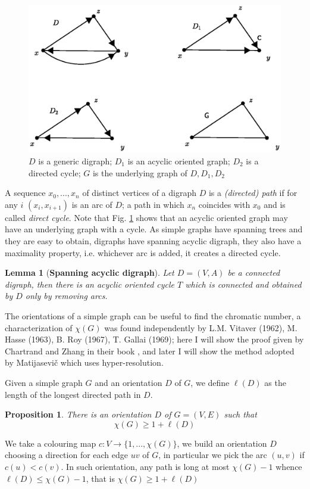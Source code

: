 \documentclass[a4paper,12pt,twoside]{book}
\newtheorem{proposition}[theorem]{Proposition}
\newtheorem{lemma}[theorem]{Lemma}
\begin{document}
\begin{figure}[h]
\centering
\includegraphics[scale=0.7]{digraphs.eps}
\caption{$D$ is a generic digraph;
		$D_1$ is an acyclic oriented graph;
		$D_2$ is a directed cycle;
		$G$ is the underlying graph of $D,D_1,D_2$}\label{digraph}
\end{figure}

\newpage
A sequence $x_0,...,x_n$ of distinct vertices of a digraph $D$ is a \textit{(directed) path} if for any $i$ $(x_i,x_{i+1})$ is an arc of $D$; a path in which $x_n$ coincides with $x_0$ and is called \textit{direct cycle}. Note that Fig. \ref{digraph} shows that an acyclic oriented graph may have an underlying graph with a cycle. As simple graphs have spanning trees and they are easy to obtain, digraphs have spanning acyclic digraph, they also have a maximality property, i.e. whichever arc is added, it creates a directed cycle.

\begin{lemma}[\textbf{Spanning acyclic digraph}]
Let $D=(V,A)$ be a connected digraph, then there is an acyclic oriented cycle $T$ which is connected and obtained by $D$ only by removing arcs.
\end{lemma}

The orientations of a simple graph can be useful to find the chromatic number, a characterization of $\chi (G)$ was found independently by L.M. Vitaver \cite{vitaver}(1962), M. Hasse \cite{hasse}(1963), B. Roy \cite{roy}(1967), T. Gallai \cite{gallai}(1969); here I will show the proof given by Chartrand and Zhang in their book \cite{chrom}, and later I will show the method adopted by Matijasevi\v{c} \cite{mat-1} which uses hyper-resolution.

Given a simple graph $G$ and an orientation $D$ of $G$, we define $\ell(D)$ as the length of the longest directed path in $D$. 
\begin{proposition}\label{prop-vitaver-easy}
There is an orientation $D$ of $G=(V,E)$ such that $$ \chi (G) \geq 1+\ell(D) $$
\end{proposition}   
We take a colouring map $c:V\rightarrow \{1,...,\chi (G)\}$, we build an orientation
 $D$ choosing a direction for each edge $uv$ of $G$, in particular we pick the arc 
 $(u,v)$ if $c(u)< c(v)$. In such orientation, any path is long at most $\chi 
 (G)-1$ whence $\ell(D)\leq \chi (G)-1  $, that is $ \chi (G) \geq 1+\ell(D) $ 
 
\end{document}
